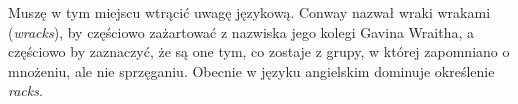 Muszę w tym miejscu wtrącić uwagę językową.
Conway nazwał wraki wrakami (\emph{wracks}), by częściowo zażartować z nazwiska jego kolegi Gavina Wraitha,
a częściowo by zaznaczyć, że są one tym, co zostaje z grupy, w której zapomniano o mnożeniu, ale nie sprzęganiu.
Obecnie w języku angielskim dominuje określenie \emph{racks}.

